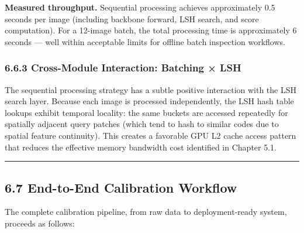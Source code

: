 \textbf{Measured throughput.} Sequential processing achieves approximately 0.5 seconds per image (including backbone forward, LSH search, and score computation). For a 12-image batch, the total processing time is approximately 6 seconds --- well within acceptable limits for offline batch inspection workflows.

\subsubsection{6.6.3 Cross-Module Interaction: Batching × LSH}\label{cross-module-interaction-batching-lsh}

The sequential processing strategy has a subtle positive interaction with the LSH search layer. Because each image is processed independently, the LSH hash table lookups exhibit temporal locality: the same buckets are accessed repeatedly for spatially adjacent query patches (which tend to hash to similar codes due to spatial feature continuity). This creates a favorable GPU L2 cache access pattern that reduces the effective memory bandwidth cost identified in Chapter 5.1.

\begin{center}\rule{0.5\linewidth}{0.5pt}\end{center}

\subsection{6.7 End-to-End Calibration Workflow}\label{end-to-end-calibration-workflow}

The complete calibration pipeline, from raw data to deployment-ready system, proceeds as follows:

